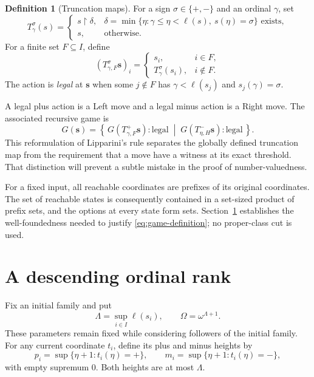 \documentclass[11pt,letterpaper]{article}
\theoremstyle{definition}
\newtheorem{definition}[theorem]{Definition}
\theoremstyle{remark}
\newcommand{\bs}{\boldsymbol{s}}
\newcommand{\len}{\ell}
\newcommand{\cut}[2]{\left\{\,#1\;\middle|\;#2\,\right\}}
\newcommand{\pref}[2]{#1\mathbin{\restriction}#2}
\newcommand{\signplus}{\mathtt{+}}
\newcommand{\signminus}{\mathtt{-}}
\begin{document}
\begin{definition}[Truncation maps]\label{def:truncation}
For a sign $\sigma\in\{\signplus,\signminus\}$ and an ordinal $\gamma$, set
\begin{equation}\label{eq:single-truncate}
 T^\sigma_\gamma(s)=
 \begin{cases}
 \pref{s}{\delta},&
 \delta=\min\{\eta:\gamma\leq\eta<\len(s),\ s(\eta)=\sigma\}
 \text{ exists},\\
 s,&\text{otherwise}.
 \end{cases}
\end{equation}
For a finite set $F\subseteq I$, define
\begin{equation}\label{eq:family-truncate}
 (T^\sigma_{\gamma,F}\bs)_i=
 \begin{cases}s_i,&i\in F,\\T^\sigma_\gamma(s_i),&i\notin F.\end{cases}
\end{equation}
The action is \emph{legal} at $\bs$ when some $j\notin F$ has
$\gamma<\len(s_j)$ and $s_j(\gamma)=\sigma$.
\end{definition}

A legal plus action is a Left move and a legal minus action is a Right move.
The associated recursive game is
\begin{equation}\label{eq:game-definition}
 G(\bs)=\cut{G(T^+_{\gamma,F}\bs):\text{legal}}
                  {G(T^-_{\eta,H}\bs):\text{legal}}.
\end{equation}
This reformulation of Lipparini's rule \cite[Remark~7.6(3)]{lipparini2026}
separates the globally defined truncation map from the requirement that a move
have a witness at its exact threshold. That distinction will prevent a subtle
mistake in the proof of number-valuedness.

For a fixed input, all reachable coordinates are prefixes of its original
coordinates. The set of reachable states is consequently contained in a
set-sized product of prefix sets, and the options at every state form sets.
Section~\ref{sec:rank} establishes the well-foundedness needed to justify
\eqref{eq:game-definition}; no proper-class cut is used.

\section{A descending ordinal rank}\label{sec:rank}

Fix an initial family and put
\begin{equation}\label{eq:rank-bound-parameters}
 \Lambda=\sup_{i\in I}\len(s_i),\qquad \Omega=\omega^{\Lambda+1}.
\end{equation}
These parameters remain fixed while considering followers of the initial
family. For any current coordinate $t_i$, define its plus and minus heights by
\begin{equation}\label{eq:polarity-heights}
 p_i=\sup\{\eta+1:t_i(\eta)=\signplus\},\qquad
 m_i=\sup\{\eta+1:t_i(\eta)=\signminus\},
\end{equation}
with empty supremum $0$. Both heights are at most $\Lambda$.
\end{document}
